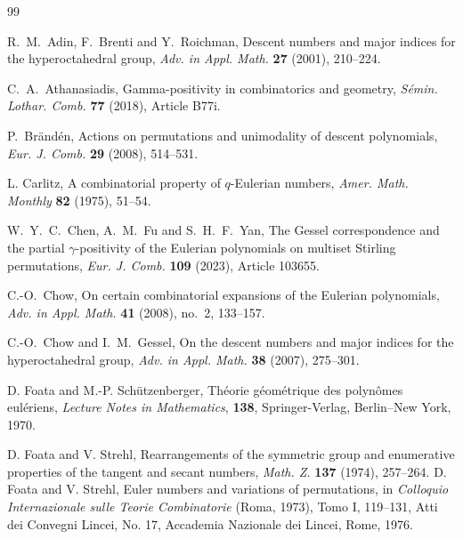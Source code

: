 \documentclass[12pt]{article}
\numberwithin{equation}{section}
\theoremstyle{plain}
\begin{document}
	
\begin{thebibliography}{99}
	
	
	R.~M.~Adin, F.~Brenti and Y.~Roichman,
	Descent numbers and major indices for the hyperoctahedral group,
	\emph{Adv. in Appl. Math.} \textbf{27} (2001), 210--224.

		C.~A.~Athanasiadis,
		Gamma-positivity in combinatorics and geometry,
		\emph{S{\'e}min. Lothar. Comb.} \textbf{77} (2018), Article B77i.
		
		
		P.~Br{\"a}nd{\'e}n,
		Actions on permutations and unimodality of descent polynomials,
		\emph{Eur. J. Comb.} \textbf{29} (2008), 514--531.
		
		
		
		L. Carlitz, A combinatorial property of $q$-Eulerian numbers,
		{\em Amer. Math. Monthly}  {\bf 82} (1975), 51--54.
		
		
		W.~Y.~C.~Chen, A.~M.~Fu and S.~H.~F.~Yan,
		The Gessel correspondence and the partial $\gamma$-positivity of the Eulerian polynomials on multiset Stirling permutations,
		\emph{Eur. J. Comb.} \textbf{109} (2023), Article 103655.
		
		 C.-O.~Chow,
		 On certain combinatorial expansions of the Eulerian polynomials,
		 \emph{Adv. in Appl. Math.} \textbf{41} (2008), no.~2, 133--157.
		
	C.-O.~Chow and I.~M.~Gessel,
	On the descent numbers and major indices for the hyperoctahedral group,
	\emph{Adv. in Appl. Math.} \textbf{38} (2007), 275--301.
				
	 
		
		 
		
	
		
	 
		
		 
		
		 D. Foata and M.-P. Sch\"utzenberger, Th\'eorie g\'eom\'etrique des polyn\^omes eul\'eriens,  \textit{Lecture Notes in Mathematics}, \textbf{138}, Springer-Verlag, Berlin--New York, 1970.
		
		 D. Foata and V. Strehl, Rearrangements of the symmetric group and enumerative properties of the tangent and secant numbers,  \textit{Math. Z.}  \textbf{137}  (1974), 257--264.
				 D. Foata and V. Strehl, Euler numbers and variations of permutations, in \textit{Colloquio Internazionale sulle Teorie Combinatorie} (Roma, 1973), Tomo I, 119--131, Atti dei Convegni Lincei, No. 17, Accademia Nazionale dei Lincei, Rome, 1976.
			

\end{thebibliography}
\end{document}
